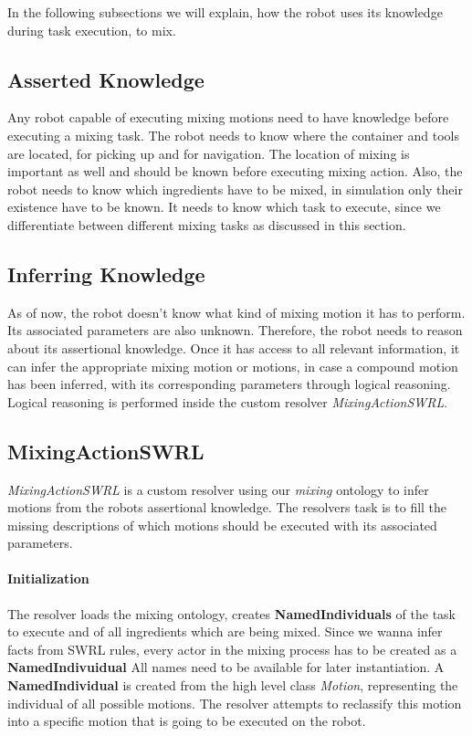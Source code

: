 In the following subsections we will explain, how the robot uses its knowledge during task execution, 
to mix. 

\subsection{Asserted Knowledge}
Any robot capable of executing mixing motions need to have knowledge before executing a mixing task. 
The robot needs to know where the container and tools are located, for picking up and for navigation.
The location of mixing is important as well and should be known before executing mixing action. 
Also, the robot needs to know which ingredients have to be mixed, in simulation only their existence have to be known. 
It needs to know which task to execute, since we differentiate between different mixing tasks as discussed in this section. 


\subsection{Inferring Knowledge}
As of now, the robot doesn't know what kind of mixing motion it has to perform. Its associated parameters are also unknown. 
Therefore, the robot needs to reason about its assertional knowledge.
Once it has access to all relevant information, it can infer the appropriate mixing motion or motions, in case a compound motion has been
inferred, with its corresponding parameters through logical reasoning.
Logical reasoning is performed inside the custom resolver \textit{MixingActionSWRL}.

\subsection{MixingActionSWRL}
\label{subsection:MixingActionSWRL}
\textit{MixingActionSWRL} is a custom resolver using our \textit{mixing} ontology to infer motions from the robots assertional knowledge.
The resolvers task is to fill the missing descriptions of which motions should be executed with its associated parameters.

\paragraph{Initialization}
The resolver loads the mixing ontology, creates \textbf{NamedIndividuals} of the task to execute and of all ingredients which are being mixed.
Since we wanna infer facts from SWRL rules, every actor in the mixing process has to be created as a \textbf{NamedIndivuidual} 
All names need to be available for later instantiation.
A \textbf{NamedIndividual} is created from the high level class \textit{Motion}, representing the individual of all possible motions. 
The resolver attempts to reclassify this motion into a specific motion that is going to be executed on the robot.

